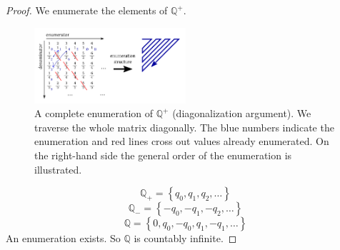 \documentclass[a4paper,landscape,twocolumn]{article}
\theoremstyle{definition}
\newcommand\set[1]{\left\{#1\right\}}
\begin{document}
\begin{proof}
  We enumerate the elements of $\mathbb Q^+$.

  \begin{figure}[!h]
    \begin{center}
      \includegraphics[width=0.5\textwidth]{img/enumeration_of_Q.pdf}
      \caption{
        A complete enumeration of $\mathbb Q^+$ (diagonalization argument).
        We traverse the whole matrix diagonally. The blue numbers indicate the
        enumeration and red lines cross out values already enumerated.
        On the right-hand side the general order of the enumeration is illustrated.
      }
    \end{center}
  \end{figure}

  \[ \mathbb Q_+ = \set{q_0, q_1, q_2, \ldots} \]
  \[ \mathbb Q_- = \set{-q_0, -q_1, -q_2, \ldots} \]
  \[ \mathbb Q = \set{0, q_0, -q_0, q_1, -q_1, \ldots} \]
  An enumeration exists. So $\mathbb Q$ is countably infinite.
\end{proof}
\end{document}

